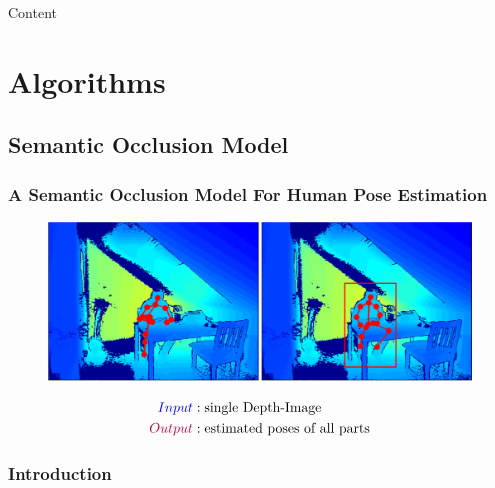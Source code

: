 \documentclass[xcolor=dvipsnames]{beamer}
\begin{document}
\begin{frame}{Content}
	\large
	\tableofcontents[subsubsectionstyle=hide]
\end{frame}

\section{Algorithms}
\subsection{Semantic Occlusion Model}
{
\begin{frame}
	\frametitle{A Semantic Occlusion Model For Human Pose Estimation}
	\vline
	\Large

	\begin{figure}
		\includegraphics[width=\textwidth]{img/HPE.png}
	\end{figure}
		
	\begin{align*}
		\textcolor{blue}{Input}&:  \text{single Depth-Image} \\
		\textcolor{purple}{Output}&: \text{estimated poses of all parts}
	\end{align*}
\end{frame}}

\subsubsection{Introduction}
\end{document}
